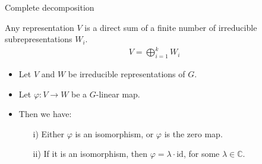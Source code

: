 \documentclass[10pt]{beamer}
\newcommand{\id}{\text{id}}
\newcommand{\CC}{\mathbb{C}}
\begin{document}
	\begin{frame}{Complete decomposition}
		\begin{corollary}
			Any representation $V$ is a direct sum of a finite number of irreducible subrepresentations $W_i$. \begin{align*}
				V = \bigoplus_{i=1}^k W_i
			\end{align*}
		\end{corollary}\pause
%				
%				
				
		\begin{theorem}
			\begin{itemize}
				\item Let $V$ and $W$ be irreducible representations of $G$.
				\item Let $\varphi: V \rightarrow W$ be a $G$-linear map.\pause
				\item Then we have: 
				\begin{itemize}
					\item[i)] Either $\varphi$ is an isomorphism, or $\varphi$ is the zero map.\pause
					\item[ii)] If it is an isomorphism, then $\varphi = \lambda \cdot \id$, for some $\lambda \in \CC$.
				\end{itemize}
				
			\end{itemize}
		\end{theorem}
	\end{frame}
\end{document}
